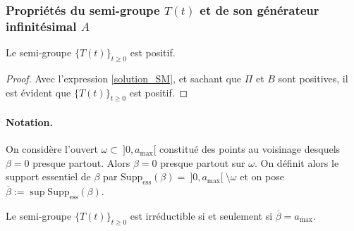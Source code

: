 \subsubsection{Propriétés du semi-groupe \texorpdfstring{$T(t)$}{T(t)} et de son générateur infinitésimal \texorpdfstring{$A$}{A}}
\begin{proposition}
    Le semi-groupe $\big\{T(t)\big\}_{t \geq 0}$ est positif.
\end{proposition}

\begin{proof}
    Avec l'expression \eqref{solution_SM}, et sachant que $\Pi$ et $B$ sont positives, il est évident que $\big\{T(t)\big\}_{t \geq 0}$ est positif.
\end{proof}

\paragraph{Notation.}
On considère l'ouvert $\omega \subset \ ]0,a_{\max}[$ constitué des points au voisinage desquels $\beta=0$ presque partout. Alors $\beta=0$ presque partout sur $\omega$. On définit alors le \textcolor{astral}{support essentiel} de $\beta$ par $\mathrm{Supp}_{\text{ess}}(\beta)=\ ]0,a_{\max}[ \ \setminus \omega$ et on pose $\overline{\beta} := \sup \mathrm{Supp}_{\text{ess}}(\beta)$.

\begin{proposition}
    Le semi-groupe $\big\{T(t)\big\}_{t \geq 0}$ est irréductible si et seulement si $\overline{\beta}=a_{\max}$.
\end{proposition}

